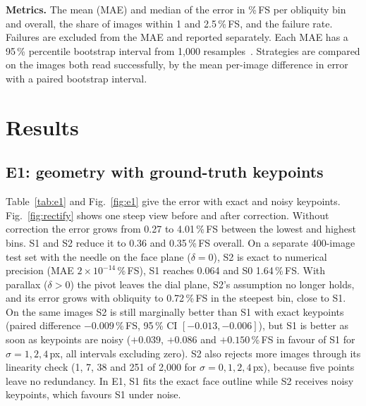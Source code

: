\documentclass[conference]{IEEEtran}
\begin{document}
\textbf{Metrics.} The mean (MAE) and median of the error in \%\,FS per obliquity bin and overall, the share of
images within 1 and 2.5\,\%\,FS, and the failure rate. Failures are excluded from the MAE and reported
separately. Each MAE has a 95\,\% percentile bootstrap interval from 1,000 resamples~\cite{efron1993}. Strategies are
compared on the images both read successfully, by the mean per-image difference in error with a paired
bootstrap interval.

\section{Results}\label{sec:results}

\subsection{E1: geometry with ground-truth keypoints}
Table~\ref{tab:e1} and Fig.~\ref{fig:e1} give the error with exact and noisy keypoints. Fig.~\ref{fig:rectify} shows one steep view before and after correction. Without correction the
error grows from 0.27 to 4.01\,\%\,FS between the lowest and highest bins. S1 and S2 reduce it to 0.36 and
0.35\,\%\,FS overall. On a separate 400-image test set with the needle on the face plane ($\delta=0$), S2 is
exact to numerical precision (MAE $2\times10^{-14}$\,\%\,FS), S1 reaches 0.064 and S0 1.64\,\%\,FS. With
parallax ($\delta>0$) the pivot leaves the dial plane, S2's assumption no longer holds, and its error grows with
obliquity to 0.72\,\%\,FS in the steepest bin, close to S1. On the same images S2 is still marginally better
than S1 with exact keypoints (paired difference $-0.009$\,\%\,FS, 95\,\% CI $[-0.013,-0.006]$), but S1 is
better as soon as keypoints are noisy ($+0.039$, $+0.086$ and $+0.150$\,\%\,FS in favour of S1 for
$\sigma=1,2,4$\,px, all intervals excluding zero). S2 also rejects more images through its linearity check
(1, 7, 38 and 251 of 2,000 for $\sigma=0,1,2,4$\,px), because five points leave no redundancy. In E1, S1 fits the exact face outline while S2
receives noisy keypoints, which favours S1 under noise.
\end{document}
